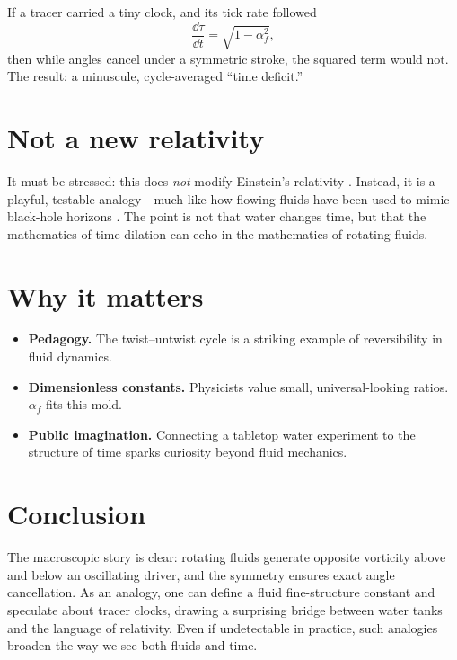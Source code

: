 \documentclass[12pt]{article}
\begin{document}
    If a tracer carried a tiny clock, and its tick rate followed
    \[
        \frac{\dd \tau}{\dd t} = \sqrt{1-\alpha_f^2},
    \]
    then while angles cancel under a symmetric stroke, the squared term would not. The result: a minuscule, cycle-averaged ``time deficit.''

    \section*{Not a new relativity}
    It must be stressed: this does \emph{not} modify Einstein's relativity \cite{Einstein1905}. Instead, it is a playful, testable analogy---much like how flowing fluids have been used to mimic black-hole horizons \cite{Unruh1981,Visser1998,Barcelo2011}. The point is not that water changes time, but that the mathematics of time dilation can echo in the mathematics of rotating fluids.

    \section*{Why it matters}
    \begin{itemize}
        \item \textbf{Pedagogy.} The twist--untwist cycle is a striking example of reversibility in fluid dynamics.
        \item \textbf{Dimensionless constants.} Physicists value small, universal-looking ratios. $\alpha_f$ fits this mold.
        \item \textbf{Public imagination.} Connecting a tabletop water experiment to the structure of time sparks curiosity beyond fluid mechanics.
    \end{itemize}

    \section*{Conclusion}
    The macroscopic story is clear: rotating fluids generate opposite vorticity above and below an oscillating driver, and the symmetry ensures exact angle cancellation. As an analogy, one can define a fluid fine-structure constant and speculate about tracer clocks, drawing a surprising bridge between water tanks and the language of relativity. Even if undetectable in practice, such analogies broaden the way we see both fluids and time.

    
    
\end{document}
